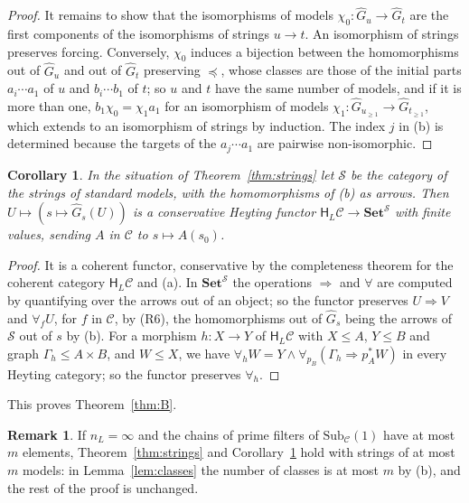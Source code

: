 \documentclass[11pt]{amsart}
\newtheorem{cor}[thm]{Corollary}
\theoremstyle{definition}
\newtheorem{rem}[thm]{Remark}
\newcommand{\Set}{\mathbf{Set}}
\newcommand{\Sub}{\mathrm{Sub}}
\newcommand{\HH}{\mathsf H}
\newcommand{\cC}{\mathcal C}
\newcommand{\cS}{\mathcal S}
\begin{document}
\begin{proof}
It remains to show that the isomorphisms of models $\chi_0\colon\hat
G_u\to\hat G_t$ are the first components of the isomorphisms of
strings $u\to t$. An isomorphism of strings preserves forcing.
Conversely, $\chi_0$ induces a bijection between the homomorphisms out
of $\hat G_u$ and out of $\hat G_t$ preserving $\preceq$, whose
classes are those of the initial parts $a_i\cdots a_1$ of $u$ and
$b_i\cdots b_1$ of $t$; so $u$ and $t$ have the same number of models,
and if it is more than one, $b_1\chi_0=\chi_1a_1$ for an isomorphism
of models $\chi_1\colon\hat G_{u_{\ge1}}\to\hat G_{t_{\ge1}}$, which
extends to an isomorphism of strings by induction. The index $j$ in
(b) is determined because the targets of the $a_j\cdots a_1$ are
pairwise non-isomorphic.
\end{proof}

\begin{cor}\label{cor:cons}
In the situation of Theorem~\ref{thm:strings} let $\cS$ be the
category of the strings of standard models, with the homomorphisms of
\emph{(b)} as arrows. Then $U\mapsto(s\mapsto\hat G_s(U))$ is a
conservative Heyting functor $\HH_L\cC\to\Set^{\cS}$ with finite
values, sending $A$ in $\cC$ to $s\mapsto A(s_0)$.
\end{cor}
\begin{proof}
It is a coherent functor, conservative by the completeness theorem for
the coherent category $\HH_L\cC$ and (a). In $\Set^\cS$ the operations
$\Rightarrow$ and $\forall$ are computed by quantifying over the
arrows out of an object; so the functor preserves $U\Rightarrow V$ and
$\forall_fU$, for $f$ in $\cC$, by (R6), the homomorphisms out of
$\hat G_s$ being the arrows of $\cS$ out of $s$ by (b). For a morphism
$h\colon X\to Y$ of $\HH_L\cC$ with $X\le A$, $Y\le B$ and graph
$\Gamma_h\le A\times B$, and $W\le X$, we have $\forall_hW=
Y\wedge\forall_{p_B}(\Gamma_h\Rightarrow p_A^*W)$ in every Heyting
category; so the functor preserves $\forall_h$.
\end{proof}

This proves Theorem~\ref{thm:B}.

\begin{rem}\label{rem:infty}
If $n_L=\infty$ and the chains of prime filters of $\Sub_\cC(1)$ have
at most $m$ elements, Theorem~\ref{thm:strings} and
Corollary~\ref{cor:cons} hold with strings of at most $m$ models: in
Lemma~\ref{lem:classes} the number of classes is at most $m$ by (b),
and the rest of the proof is unchanged.
\end{rem}
\end{document}
